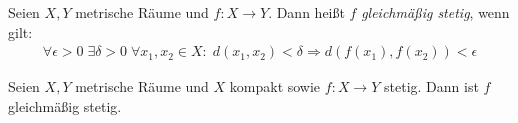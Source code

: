 \begin{Definition}%
	Seien $X,Y$ metrische Räume und $f:X \rightarrow Y$. Dann heißt $f$ 
	\emph{gleichmäßig stetig}, wenn gilt:
		\begin{align*}
			\forall \epsilon > 0 \; \exists \delta > 0 \; \forall x_1,x_2 \in X:
			\; d(x_1,x_2)< \delta \Rightarrow d(f(x_1),f(x_2)) < \epsilon
		\end{align*}
\end{Definition}

\begin{Satz}%
	Seien $X,Y$ metrische Räume und $X$ kompakt sowie $f:X \rightarrow Y$ stetig. 
	Dann ist $f$ gleichmäßig stetig.
\end{Satz}

